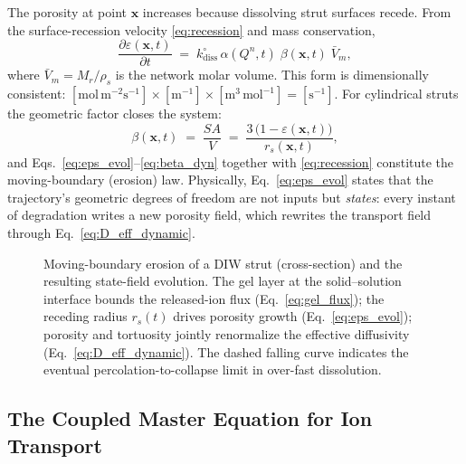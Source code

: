 \documentclass[11pt]{article}
\newcommand{\pde}[2]{\frac{\partial #1}{\partial #2}}
\begin{document}
The porosity at point $\mathbf{x}$ increases because dissolving strut surfaces recede. From the surface-recession velocity \eqref{eq:recession} and mass conservation,
\begin{equation}
\pde{\varepsilon(\mathbf{x},t)}{t} \;=\; k^{\circ}_{\mathrm{diss}}\,\alpha(Q^n,t)\;\beta(\mathbf{x},t)\;\bar{V}_m,
\label{eq:eps_evol}
\end{equation}
where $\bar{V}_m=M_r/\rho_s$ is the network molar volume. This form is dimensionally consistent: $[\mathrm{mol\,m^{-2}s^{-1}}]\times[\mathrm{m^{-1}}]\times[\mathrm{m^{3}\,mol^{-1}}]=[\mathrm{s^{-1}}]$. For cylindrical struts the geometric factor closes the system:
\begin{equation}
\beta(\mathbf{x},t) \;=\; \frac{SA}{V} \;=\; \frac{3\,\bigl(1-\varepsilon(\mathbf{x},t)\bigr)}{r_s(\mathbf{x},t)},
\label{eq:beta_dyn}
\end{equation}
and Eqs.~\eqref{eq:eps_evol}--\eqref{eq:beta_dyn} together with \eqref{eq:recession} constitute the moving-boundary (erosion) law. Physically, Eq.~\eqref{eq:eps_evol} states that the trajectory's geometric degrees of freedom are not inputs but \emph{states}: every instant of degradation writes a new porosity field, which rewrites the transport field through Eq.~\eqref{eq:D_eff_dynamic}.


\begin{figure}[htbp]
\centering

\caption{Moving-boundary erosion of a DIW strut (cross-section) and the resulting state-field evolution. The gel layer at the solid--solution interface bounds the released-ion flux (Eq.~\eqref{eq:gel_flux}); the receding radius $r_s(t)$ drives porosity growth (Eq.~\eqref{eq:eps_evol}); porosity and tortuosity jointly renormalize the effective diffusivity (Eq.~\eqref{eq:D_eff_dynamic}). The dashed falling curve indicates the eventual percolation-to-collapse limit in over-fast dissolution.}
\label{fig:moving}
\end{figure}


\subsection{The Coupled Master Equation for Ion Transport}
\end{document}
